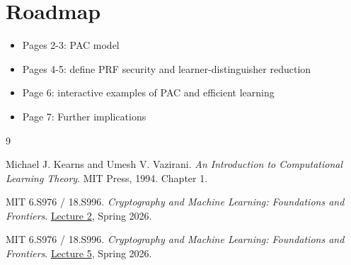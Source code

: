 \documentclass[11pt,fleqn]{article}
\begin{document}
\section{Roadmap}

\begin{itemize}
    \item Pages 2-3: PAC model
    \item Pages 4-5: define PRF security and learner-distinguisher reduction
    \item Page 6: interactive examples of PAC and efficient learning
    \item Page 7: Further implications
\end{itemize}

\begin{thebibliography}{9}

Michael J. Kearns and Umesh V. Vazirani.
\emph{An Introduction to Computational Learning Theory}.
MIT Press, 1994. Chapter 1.

MIT 6.S976 / 18.S996.
\emph{Cryptography and Machine Learning: Foundations and Frontiers}.
\href{https://mlcrypto.mit.edu/course/}{Lecture 2}, Spring 2026.

MIT 6.S976 / 18.S996.
\emph{Cryptography and Machine Learning: Foundations and Frontiers}.
\href{https://mlcrypto.mit.edu/course/slides/lec5.pdf}{Lecture 5},
Spring 2026.

\end{thebibliography}
\end{document}
